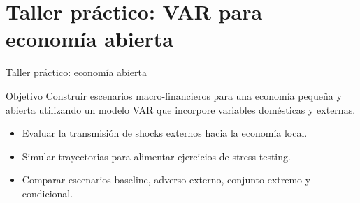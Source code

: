 \section{Taller práctico: VAR para economía abierta}

\begin{frame}{Taller práctico: economía abierta}

\begin{block}{Objetivo}
Construir escenarios macro-financieros para una economía pequeña y abierta utilizando un modelo VAR que incorpore variables domésticas y externas.
\end{block}

\begin{itemize}
    \item Evaluar la transmisión de shocks externos hacia la economía local.
    \item Simular trayectorias para alimentar ejercicios de stress testing.
    \item Comparar escenarios baseline, adverso externo, conjunto extremo y condicional.
\end{itemize}

\end{frame}

